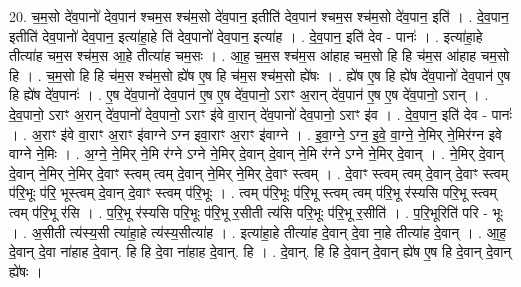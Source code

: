 \documentclass[17pt]{extarticle}
\begin{document}
20. च॒म॒सो दे॑व॒पानो॑ देव॒पान॑ श्चम॒स श्च॑म॒सो दे॑व॒पान॒ इतीति॑ देव॒पान॑ श्चम॒स श्च॑म॒सो दे॑व॒पान॒ इति॑ । . दे॒व॒पान॒ इतीति॑ देव॒पानो॑ देव॒पान॒ इत्या॑हा॒हे ति॑ देव॒पानो॑ देव॒पान॒ इत्या॑ह । . दे॒व॒पान॒ इति॑ देव - पानः॑ । . इत्या॑हा॒हे तीत्या॑ह चम॒स श्च॑म॒स आ॒हे तीत्या॑ह चम॒सः । . आ॒ह॒ च॒म॒स श्च॑म॒स आ॑हाह चम॒सो हि हि च॑म॒स आ॑हाह चम॒सो हि । . च॒म॒सो हि हि च॑म॒स श्च॑म॒सो ह्ये॑ष ए॒ष हि च॑म॒स श्च॑म॒सो ह्ये॑षः । . ह्ये॑ष ए॒ष हि ह्ये॑ष दे॑व॒पानो॑ देव॒पान॑ ए॒ष हि ह्ये॑ष दे॑व॒पानः॑ । . ए॒ष दे॑व॒पानो॑ देव॒पान॑ ए॒ष ए॒ष दे॑व॒पानो॒ ऽराꣳ अ॒रान् दे॑व॒पान॑ ए॒ष ए॒ष दे॑व॒पानो॒ ऽरान् । . दे॒व॒पानो॒ ऽराꣳ अ॒रान् दे॑व॒पानो॑ देव॒पानो॒ ऽराꣳ इ॑वे वा॒रान् दे॑व॒पानो॑ देव॒पानो॒ ऽराꣳ इ॑व । . दे॒व॒पान॒ इति॑ देव - पानः॑ । . अ॒राꣳ इ॑वे वा॒राꣳ अ॒राꣳ इ॑वाग्ने ऽग्न इवा॒राꣳ अ॒राꣳ इ॑वाग्ने । . इ॒वा॒ग्ने॒ ऽग्न॒ इ॒वे॒ वा॒ग्ने॒ ने॒मिर् ने॒मिर॑ग्न इवे वाग्ने ने॒मिः । . अ॒ग्ने॒ ने॒मिर् ने॒मि र॑ग्ने ऽग्ने ने॒मिर् दे॒वान् दे॒वान् ने॒मि र॑ग्ने ऽग्ने ने॒मिर् दे॒वान् । . ने॒मिर् दे॒वान् दे॒वान् ने॒मिर् ने॒मिर् दे॒वाꣳ स्त्वम् त्वम् दे॒वान् ने॒मिर् ने॒मिर् दे॒वाꣳ स्त्वम् । . दे॒वाꣳ स्त्वम् त्वम् दे॒वान् दे॒वाꣳ स्त्वम् प॑रि॒भूः प॑रि॒ भूस्त्वम् दे॒वान् दे॒वाꣳ स्त्वम् प॑रि॒भूः । . त्वम् प॑रि॒भूः प॑रि॒भू स्त्वम् त्वम् प॑रि॒भू र॑स्यसि परि॒भू स्त्वम् त्वम् प॑रि॒भू र॑सि । . प॒रि॒भू र॑स्यसि परि॒भूः प॑रि॒भू र॒सीती त्य॑सि परि॒भूः प॑रि॒भू र॒सीति॑ । . प॒रि॒भूरिति॑ परि - भूः । . अ॒सीती त्य॑स्य॒सी त्या॑हा॒हे त्य॑स्य॒सीत्या॑ह । . इत्या॑हा॒हे तीत्या॑ह दे॒वान् दे॒वा ना॒हे तीत्या॑ह दे॒वान् । . आ॒ह॒ दे॒वान् दे॒वा ना॑हाह दे॒वान्. हि हि दे॒वा ना॑हाह दे॒वान्. हि । . दे॒वान्. हि हि दे॒वान् दे॒वान् ह्ये॑ष ए॒ष हि दे॒वान् दे॒वान् ह्ये॑षः । \newline
\end{document}
